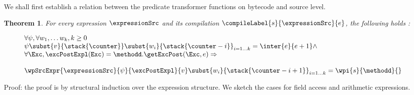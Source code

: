 \newtheorem{thm}{Theorem}[section]



    
We shall first establish a relation between the \wpName{} predicate transformer functions
on bytecode and source level. 
\begin{thm}\label{relWpStmt}
     For every expression $\expressionSrc$ and its compilation  $\compileLabel{s}{\expressionSrc}{e}$, the following holds :

  $$ \begin{array}{l} 
      \forall \psi,   \forall w_1, \ldots w_{k}, k \ge 0 \\
	\psi \subst{v}{\stack{\counter}}\subst{w_i}{\stack{\counter - i}}_{i = 1 \ldots k}  = \inter{e}{e+1} \wedge \\
	 \forall \Exc ,  \excPostExpl( \mbox{\rm\texttt{Exc}} ) = \methodd.\getExcPost(\Exc, e ) \Rightarrow \\\\
	 \wpSrcExpr{\expressionSrc }{\psi}{\excPostExpl}{v} \subst{w_i}{\stack{\counter - i + 1}} _{i = 1 \ldots k} =
	\wpi{s}{\methodd}{}
	
     \end{array}
  $$    
 \end{thm}
Proof: the proof is by structural induction over the expression structure. We sketch 
the cases for field access and arithmetic expressions.


